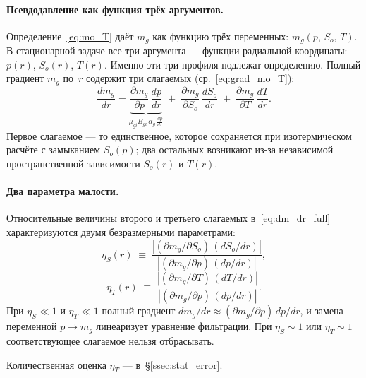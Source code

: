 ﻿\documentclass[12pt,a4paper]{article}
\begin{document}
\paragraph{Псевдодавление как функция трёх аргументов.}
Определение~\eqref{eq:mo_T} даёт $m_g$ как
функцию трёх переменных: $m_g(p,\,S_o,\,T)$.
В стационарной задаче все три аргумента --- функции
радиальной координаты: $p(r)$, $S_o(r)$, $T(r)$.
Именно эти три профиля подлежат определению.
Полный градиент $m_g$ по~$r$ содержит
три слагаемых (ср.~\eqref{eq:grad_mo_T}):
\begin{equation}\label{eq:dm_dr_full}
  \frac{d m_g}{d r}
  = \underbrace{\frac{\partial m_g}{\partial p}\,\frac{dp}{dr}}_{\displaystyle
    \mu_{gi}B_{gi}\,\alpha_g\,\frac{dp}{dr}}
  \;+\;\frac{\partial m_g}{\partial S_o}\,\frac{dS_o}{dr}
  \;+\;\frac{\partial m_g}{\partial T}\,\frac{dT}{dr}.
\end{equation}
Первое слагаемое --- то единственное, которое
сохраняется при изотермическом расчёте с замыканием
$S_o(p)$; два остальных возникают из-за независимой
пространственной зависимости $S_o(r)$ и $T(r)$.

\paragraph{Два параметра малости.}
Относительные величины второго и третьего слагаемых
в~\eqref{eq:dm_dr_full} характеризуются двумя
безразмерными параметрами:
\begin{equation}\label{eq:eta_S}
  \eta_S(r) \;\equiv\;
  \frac{|(\partial m_g/\partial S_o)\,(dS_o/dr)|}
       {|(\partial m_g/\partial p)\,(dp/dr)|},
\end{equation}
\begin{equation}\label{eq:eta_T}
  \eta_T(r) \;\equiv\;
  \frac{|(\partial m_g/\partial T)\,(dT/dr)|}
       {|(\partial m_g/\partial p)\,(dp/dr)|}.
\end{equation}
При $\eta_S \ll 1$ и $\eta_T \ll 1$ полный градиент
$dm_g/dr \approx (\partial m_g/\partial p)\,dp/dr$,
и замена переменной $p \to m_g$ линеаризует уравнение
фильтрации. При $\eta_S \sim 1$ или $\eta_T \sim 1$
соответствующее слагаемое нельзя отбрасывать.

Количественная оценка $\eta_T$ ---
в~\S\ref{ssec:stat_error}.
\end{document}
